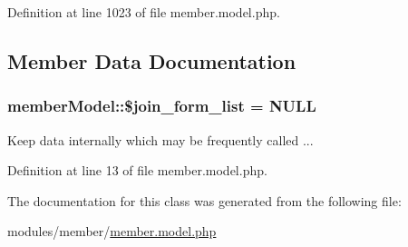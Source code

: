 Definition at line 1023 of file member.\+model.\+php.



\subsection{Member Data Documentation}
\subsubsection[{\texorpdfstring{\$join\+\_\+form\+\_\+list}{$join_form_list}}]{\setlength{\rightskip}{0pt plus 5cm}member\+Model\+::\$join\+\_\+form\+\_\+list = N\+U\+LL}\hypertarget{classmemberModel_aa9b942e17ed74955c8700dd74d75d2b2}{}\label{classmemberModel_aa9b942e17ed74955c8700dd74d75d2b2}


Keep data internally which may be frequently called ... 



Definition at line 13 of file member.\+model.\+php.



The documentation for this class was generated from the following file\+:\begin{DoxyCompactItemize}
\item 
modules/member/\hyperlink{member_8model_8php}{member.\+model.\+php}\end{DoxyCompactItemize}
